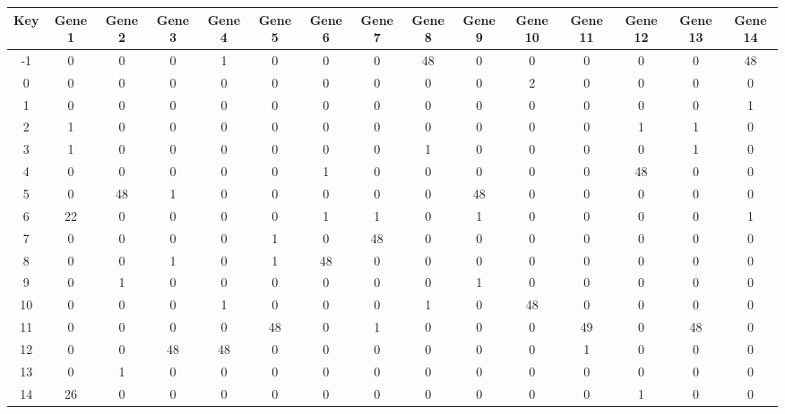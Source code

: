 \begin{tabular}{|c|c|c|c|c|c|c|c|c|c|c|c|c|c|c|}
\hline
Key & Gene 1 & Gene 2 & Gene 3 & Gene 4 & Gene 5 & Gene 6 & Gene 7 & Gene 8 & Gene 9 & Gene 10 & Gene 11 & Gene 12 & Gene 13 & Gene 14 \\
\hline
-1 & 0 & 0 & 0 & 1 & 0 & 0 & 0 & 48 & 0 & 0 & 0 & 0 & 0 & 48 \\
0 & 0 & 0 & 0 & 0 & 0 & 0 & 0 & 0 & 0 & 2 & 0 & 0 & 0 & 0 \\
1 & 0 & 0 & 0 & 0 & 0 & 0 & 0 & 0 & 0 & 0 & 0 & 0 & 0 & 1 \\
2 & 1 & 0 & 0 & 0 & 0 & 0 & 0 & 0 & 0 & 0 & 0 & 1 & 1 & 0 \\
3 & 1 & 0 & 0 & 0 & 0 & 0 & 0 & 1 & 0 & 0 & 0 & 0 & 1 & 0 \\
4 & 0 & 0 & 0 & 0 & 0 & 1 & 0 & 0 & 0 & 0 & 0 & 48 & 0 & 0 \\
5 & 0 & 48 & 1 & 0 & 0 & 0 & 0 & 0 & 48 & 0 & 0 & 0 & 0 & 0 \\
6 & 22 & 0 & 0 & 0 & 0 & 1 & 1 & 0 & 1 & 0 & 0 & 0 & 0 & 1 \\
7 & 0 & 0 & 0 & 0 & 1 & 0 & 48 & 0 & 0 & 0 & 0 & 0 & 0 & 0 \\
8 & 0 & 0 & 1 & 0 & 1 & 48 & 0 & 0 & 0 & 0 & 0 & 0 & 0 & 0 \\
9 & 0 & 1 & 0 & 0 & 0 & 0 & 0 & 0 & 1 & 0 & 0 & 0 & 0 & 0 \\
10 & 0 & 0 & 0 & 1 & 0 & 0 & 0 & 1 & 0 & 48 & 0 & 0 & 0 & 0 \\
11 & 0 & 0 & 0 & 0 & 48 & 0 & 1 & 0 & 0 & 0 & 49 & 0 & 48 & 0 \\
12 & 0 & 0 & 48 & 48 & 0 & 0 & 0 & 0 & 0 & 0 & 1 & 0 & 0 & 0 \\
13 & 0 & 1 & 0 & 0 & 0 & 0 & 0 & 0 & 0 & 0 & 0 & 0 & 0 & 0 \\
14 & 26 & 0 & 0 & 0 & 0 & 0 & 0 & 0 & 0 & 0 & 0 & 1 & 0 & 0 \\
\hline
\end{tabular}